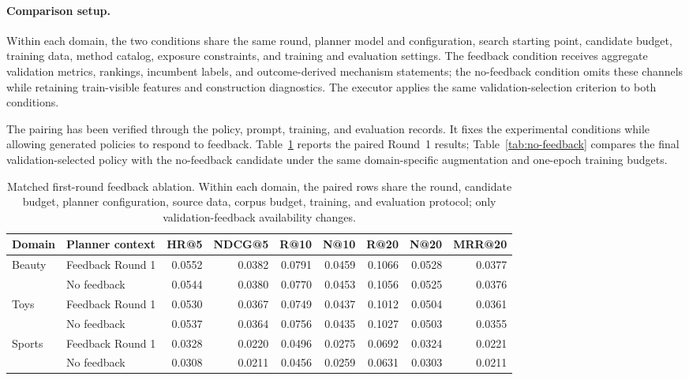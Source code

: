 \paragraph{Comparison setup.}
Within each domain, the two conditions share the same round, planner model and configuration, search starting point, candidate budget, training data, method catalog, exposure constraints, and training and evaluation settings. The feedback condition receives aggregate validation metrics, rankings, incumbent labels, and outcome-derived mechanism statements; the no-feedback condition omits these channels while retaining train-visible features and construction diagnostics. The executor applies the same validation-selection criterion to both conditions.

The pairing has been verified through the policy, prompt, training, and evaluation records. It fixes the experimental conditions while allowing generated policies to respond to feedback. Table~\ref{tab:feedback-raw} reports the paired Round~1 results; Table~\ref{tab:no-feedback} compares the final validation-selected policy with the no-feedback candidate under the same domain-specific augmentation and one-epoch training budgets.

\begin{table}[H]
\centering
\caption{Matched first-round feedback ablation. Within each domain, the paired rows share the round, candidate budget, planner configuration, source data, corpus budget, training, and evaluation protocol; only validation-feedback availability changes.}
\label{tab:feedback-raw}
\small
\renewcommand{\arraystretch}{1.08}
\setlength{\tabcolsep}{3.4pt}
\begin{tabular}{llrrrrrrr}
\toprule
Domain & Planner context & HR@5 & NDCG@5 & R@10 & N@10 & R@20 & N@20 & MRR@20 \\
\midrule
Beauty & Feedback Round 1 & 0.0552 & 0.0382 & 0.0791 & 0.0459 & 0.1066 & 0.0528 & 0.0377 \\
       & No feedback      & 0.0544 & 0.0380 & 0.0770 & 0.0453 & 0.1056 & 0.0525 & 0.0376 \\
Toys   & Feedback Round 1 & 0.0530 & 0.0367 & 0.0749 & 0.0437 & 0.1012 & 0.0504 & 0.0361 \\
       & No feedback      & 0.0537 & 0.0364 & 0.0756 & 0.0435 & 0.1027 & 0.0503 & 0.0355 \\
Sports & Feedback Round 1 & 0.0328 & 0.0220 & 0.0496 & 0.0275 & 0.0692 & 0.0324 & 0.0221 \\
       & No feedback      & 0.0308 & 0.0211 & 0.0456 & 0.0259 & 0.0631 & 0.0303 & 0.0211 \\
\bottomrule
\end{tabular}
\end{table}

